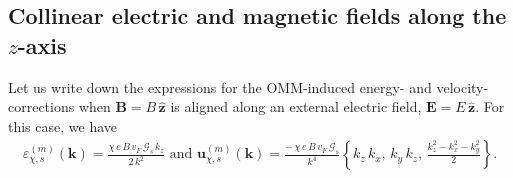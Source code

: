 \documentclass[aps,prb,onecolumn,nofootinbib,citeautoscript,10pt]{revtex4-2}
\begin{document}
\subsection{Collinear electric and magnetic fields along the $z$-axis}

Let us write down the expressions for the OMM-induced energy- and velocity-corrections when $\boldsymbol B  =  B\, \boldsymbol{\hat{z}}$ is aligned along an external electric field, $ \boldsymbol E  =  E\, \boldsymbol{\hat{z}}$. For this case, we have
\begin{align}
\varepsilon_{\chi, s}^{(m)}   (\boldsymbol k)  = 
\frac{  \chi \, e\, B \, v_F \, \mathcal{G}_s \,  k_z } 
{2 \, k^2 } \text{ and }
{\boldsymbol  u}^{(m)}_{\chi, s} ({\boldsymbol k} ) 
=  \frac{ -\, \chi \, e\, B \, v_F \,  \mathcal{G}_s   } { k^4 }
 \left \lbrace k_z \, k_x, \, k_y \, k_z, \,  \frac{k_z^2 -k_x^2 - k_y^2 } {2} \right \rbrace .
\end{align}
\end{document}
